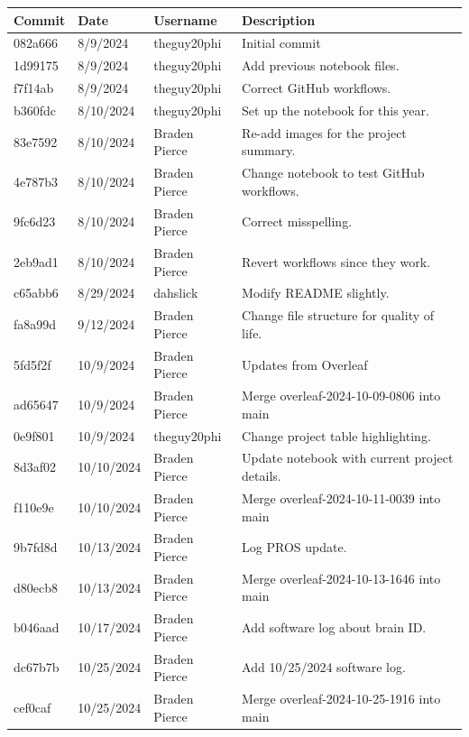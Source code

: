 \begin{center}
\begin{longtable}{|p{28pt}|p{33pt}|p{40pt}|p{300pt}|}
\hline
\textbf{Commit} & \textbf{Date} & \textbf{Username} & \textbf{Description} \\
\hline
082a666 & 8/9/2024 & theguy20phi & Initial commit \\
\hline
1d99175 & 8/9/2024 & theguy20phi & Add previous notebook files. \\
\hline
f7f14ab & 8/9/2024 & theguy20phi & Correct GitHub workflows. \\
\hline
b360fdc & 8/10/2024 & theguy20phi & Set up the notebook for this year. \\
\hline
83e7592 & 8/10/2024 & Braden Pierce & Re-add images for the project summary. \\
\hline
4e787b3 & 8/10/2024 & Braden Pierce & Change notebook to test GitHub workflows. \\
\hline
9fc6d23 & 8/10/2024 & Braden Pierce & Correct misspelling. \\
\hline
2eb9ad1 & 8/10/2024 & Braden Pierce & Revert workflows since they work. \\
\hline
c65abb6 & 8/29/2024 & dahslick & Modify README slightly. \\
\hline
fa8a99d & 9/12/2024 & Braden Pierce & Change file structure for quality of life. \\
\hline
5fd5f2f & 10/9/2024 & Braden Pierce & Updates from Overleaf \\
\hline
ad65647 & 10/9/2024 & Braden Pierce & Merge overleaf-2024-10-09-0806 into main \\
\hline
0e9f801 & 10/9/2024 & theguy20phi & Change project table highlighting. \\
\hline
8d3af02 & 10/10/2024 & Braden Pierce & Update notebook with current project details. \\
\hline
f110e9e & 10/10/2024 & Braden Pierce & Merge overleaf-2024-10-11-0039 into main \\
\hline
9b7fd8d & 10/13/2024 & Braden Pierce & Log PROS update. \\
\hline
d80ecb8 & 10/13/2024 & Braden Pierce & Merge overleaf-2024-10-13-1646 into main \\
\hline
b046aad & 10/17/2024 & Braden Pierce & Add software log about brain ID. \\
\hline
dc67b7b & 10/25/2024 & Braden Pierce & Add 10/25/2024 software log. \\
\hline
cef0caf & 10/25/2024 & Braden Pierce & Merge overleaf-2024-10-25-1916 into main \\

\end{longtable}
\end{center}
